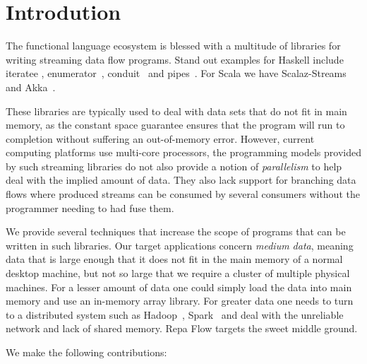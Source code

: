 \section{Introdution}

The functional language ecosystem is blessed with a multitude of libraries for writing streaming data flow programs. Stand out examples for Haskell include iteratee \cite{Kiselyov:iteratee}, enumerator~\cite{hackage:enumerator}, conduit~\cite{hackage:conduit} and pipes~\cite{hackage:pipes}. For Scala we have Scalaz-Streams~\cite{github:scalaz-streams} and Akka~\cite{github:akka}.

These libraries are typically used to deal with data sets that do not fit in main memory, as the constant space guarantee ensures that the program will run to completion without suffering an out-of-memory error. However, current computing platforms use multi-core processors, the programming models provided by such streaming libraries do not also provide a notion of \emph{parallelism} to help deal with the implied amount of data. They also lack support for branching data flows where produced streams can be consumed by several consumers without the programmer needing to had fuse them.

We provide several techniques that increase the scope of programs that can be written in such libraries. Our target applications concern \emph{medium data}, meaning data that is large enough that it does not fit in the main memory of a normal desktop machine, but not so large that we require a cluster of multiple physical machines. For a lesser amount of data one could simply load the data into main memory and use an in-memory array library. For greater data one needs to turn to a distributed system such as Hadoop~\cite{Shvachko:Hadoop}, Spark~\cite{Zaharia:RDDs} and deal with the unreliable network and lack of shared memory. Repa Flow targets the sweet middle ground.

\eject
We make the following contributions:

